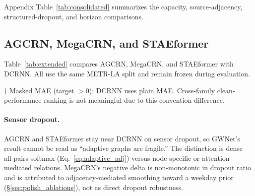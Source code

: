 Appendix Table~\ref{tab:consolidated} summarizes the capacity, source-adjacency, structured-dropout, and horizon comparisons.

\subsection{AGCRN, MegaCRN, and STAEformer}
\label{sec:extended}

Table~\ref{tab:extended} compares AGCRN, MegaCRN, and STAEformer with DCRNN. All use the same METR-LA split and remain frozen during evaluation.

\begin{table}[H]
\centering
\caption{\textbf{Adaptive-relation models under the three test conditions.}
Clean MAE follows each architecture's standard masked-MAE convention; shift
columns use the same normalized protocol as Table~\ref{tab:main}.}
\label{tab:extended}
\vskip 0.05in
\vskip 0.05in
{\footnotesize $\dagger$ Masked MAE (target $> 0$); DCRNN uses plain MAE.
Cross-family clean-performance ranking is not meaningful due to this convention difference.}
\end{table}

\paragraph{Sensor dropout.}
AGCRN and STAEformer stay near DCRNN on sensor dropout, so GWNet's result
cannot be read as ``adaptive graphs are fragile.'' The distinction is dense
all-pairs softmax (Eq.~\ref{eq:adaptive_adj}) versus node-specific or
attention-mediated relations. MegaCRN's negative delta is non-monotonic in
dropout ratio and is attributed to adjacency-mediated smoothing toward a weekday prior (\S\ref{sec:polish_ablations}), not as direct dropout
robustness.

